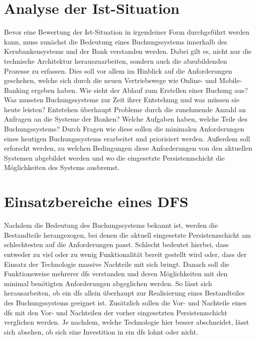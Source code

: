 \documentclass[12pt,oneside,a4paper,parskip]{scrbook}
\begin{document}
\section{Analyse der Ist-Situation}
Bevor eine Bewertung der Ist-Situation in irgendeiner Form durchgeführt werden kann, muss zunächst die Bedeutung eines Buchungssystems innerhalb des Kernbankensystems und der Bank verstanden werden. Dabei gilt es, nicht nur die technische Architektur herauszuarbeiten, sondern auch die abzubildenden Prozesse zu erfassen. Dies soll vor allem im Hinblick auf die Anforderungen geschehen, welche sich durch die neuen Vertriebswege wie Online- und Mobile-Banking ergeben haben. Wie sieht der Ablauf zum Erstellen einer Buchung aus? Was mussten Buchungssysteme zur Zeit ihrer Entstehung und was müssen sie heute leisten? Entstehen überhaupt Probleme durch die zunehmende Anzahl an Anfragen an die Systeme der Banken? Welche Aufgaben haben, welche Teile des Buchungssystems? Durch Fragen wie diese sollen die minimalen Anforderungen eines heutigen Buchungssystems erarbeitet und priorisiert werden. Außerdem soll erforscht werden, zu welchen Bedingungen diese Anforderungen von den aktuellen Systemen abgebildet werden und wo die eingesetzte Persistenzschicht die Möglichkeiten des Systems ausbremst.

\section{Einsatzbereiche eines DFS}
Nachdem die Bedeutung des Buchungssystems bekannt ist, werden die Bestandteile herangezogen, bei denen die aktuell eingesetzte Persistenzschicht am schlechtesten auf die Anforderungen passt. Schlecht bedeutet hierbei, dass entweder zu viel oder zu wenig Funktionalität bereit gestellt wird oder, dass der Einsatz der Technologie massive Nachteile mit sich bringt. Danach soll die Funktionsweise mehrerer \ac{dfs} verstanden und deren Möglichkeiten mit den minimal benötigten Anforderungen abgeglichen werden. So lässt sich herausarbeiten, ob ein \ac{dfs} allein überhaupt zur Realisierung eines Bestandteiles des Buchungssystems geeignet ist. Zusätzlich sollen die Vor- und Nachteile eines \ac{dfs} mit den Vor- und Nachteilen der vorher eingesetzten Persistenzschicht verglichen werden. Je nachdem, welche Technologie hier besser abschneidet, lässt sich absehen, ob sich eine Investition in ein \ac{dfs} lohnt oder nicht.
\end{document}
